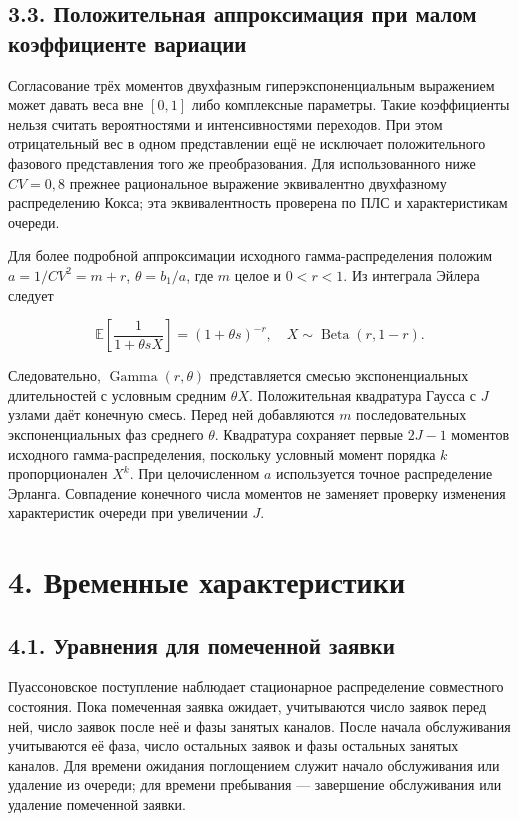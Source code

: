 \subsection*{3.3. Положительная аппроксимация при малом коэффициенте вариации}
Согласование трёх моментов двухфазным гиперэкспоненциальным выражением может давать веса вне \([0,1]\) либо комплексные параметры. Такие коэффициенты нельзя считать вероятностями и интенсивностями переходов. При этом отрицательный вес в одном представлении ещё не исключает положительного фазового представления того же преобразования. Для использованного ниже \(CV=0{,}8\) прежнее рациональное выражение эквивалентно двухфазному распределению Кокса; эта эквивалентность проверена по ПЛС и характеристикам очереди.

Для более подробной аппроксимации исходного гамма-распределения положим \(a=1/CV^2=m+r\), \(\theta=b_1/a\), где \(m\) целое и \(0<r<1\). Из интеграла Эйлера \cite{nistdlmf} следует


\[\mathbb E\!\left[\frac{1}{1+\theta sX}\right]=(1+\theta s)^{-r},\quad
X\sim\operatorname{Beta}(r,1-r).\]


Следовательно, \(\operatorname{Gamma}(r,\theta)\) представляется смесью экспоненциальных длительностей с условным средним \(\theta X\). Положительная квадратура Гаусса с \(J\) узлами даёт конечную смесь. Перед ней добавляются \(m\) последовательных экспоненциальных фаз среднего \(\theta\). Квадратура сохраняет первые \(2J-1\) моментов исходного гамма-распределения, поскольку условный момент порядка \(k\) пропорционален \(X^k\). При целочисленном \(a\) используется точное распределение Эрланга. Совпадение конечного числа моментов не заменяет проверку изменения характеристик очереди при увеличении \(J\).

\section*{4. Временные характеристики}
\subsection*{4.1. Уравнения для помеченной заявки}
Пуассоновское поступление наблюдает стационарное распределение совместного состояния. Пока помеченная заявка ожидает, учитываются число заявок перед ней, число заявок после неё и фазы занятых каналов. После начала обслуживания учитываются её фаза, число остальных заявок и фазы остальных занятых каналов. Для времени ожидания поглощением служит начало обслуживания или удаление из очереди; для времени пребывания --- завершение обслуживания или удаление помеченной заявки.

